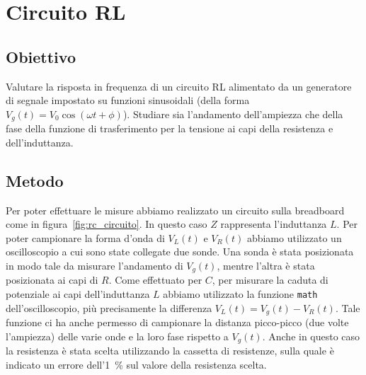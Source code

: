 \documentclass[a4paper]{article}
\begin{document}
\section{Circuito RL}
\subsection{Obiettivo}
Valutare la risposta in frequenza di un circuito RL alimentato da un generatore di segnale impostato su funzioni sinusoidali (della forma 
$V_g(t) = V_{0} \cos(\omega t + \phi)$). Studiare sia l'andamento dell'ampiezza che della fase della funzione di trasferimento per la tensione ai capi della resistenza e dell'induttanza.
\subsection{Metodo}
Per poter effettuare le misure abbiamo realizzato un circuito sulla breadboard come in figura~\ref{fig:rc_circuito}. In questo caso $Z$ rappresenta l'induttanza $L$. Per poter campionare la forma d'onda di $V_L(t)$ e $V_R(t)$ abbiamo utilizzato un oscilloscopio a cui sono state collegate due sonde. Una sonda è stata posizionata in modo tale da misurare l'andamento di $V_g(t)$, mentre l'altra è stata posizionata ai capi di $R$. Come effettuato per $C$, per misurare la caduta di potenziale ai capi dell'induttanza $L$ abbiamo utilizzato la funzione \texttt{math} dell'oscilloscopio, più precisamente la differenza $V_L(t) = V_g(t) - V_R(t)$. Tale funzione ci ha anche permesso di campionare la distanza picco-picco (due volte l'ampiezza) delle varie onde e la loro fase rispetto a $V_g(t)$. Anche in questo caso la resistenza è stata scelta utilizzando la cassetta di resistenze, sulla quale è indicato un errore dell'\SI{1}{\percent} sul valore della resistenza scelta. 
\end{document}
